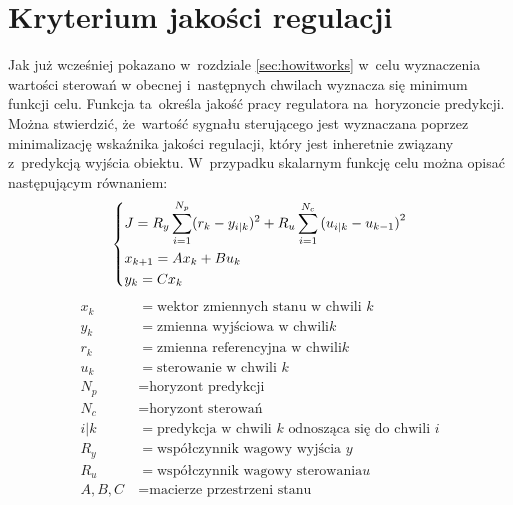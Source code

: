 \section{Kryterium jakości regulacji} \label{sec:quality}
Jak już wcześniej pokazano w~rozdziale \ref{sec:howitworks} w~celu wyznaczenia wartości sterowań
w obecnej i~następnych chwilach wyznacza się minimum funkcji celu. Funkcja ta~określa jakość pracy
regulatora na~horyzoncie predykcji. Można stwierdzić, że~wartość sygnału sterującego jest wyznaczana
poprzez minimalizację wskaźnika jakości regulacji, który jest inheretnie związany z~predykcją wyjścia
obiektu. \cite{mpc_book} \cite{mpc_pl} \cite{mpc_en} \cite{nuclear}
\newline W~przypadku skalarnym funkcję celu można opisać następującym równaniem:
\begin{equation}
    \begin{dcases}
        J=R_{y}\sum _{i=1}^{N_{p}}(r_{k}-y_{i|k})^{2}+R_{u}\sum _{i=1}^{N_{c}}{(u_{i|k}-u_{k-1})}^{2}\\
        x_{k+1}=Ax_{k}+Bu_{k}\\
        y_{k}=Cx_{k} 
    \end{dcases}
\label{eq:quality}
\end{equation}
\begin{align*}
    x_{k} &= \text{wektor zmiennych stanu w~chwili }k\\
    y_{k} &= \text{zmienna wyjściowa w~chwili} k\\
    r_{k} &= \text{zmienna referencyjna w~chwili} k\\
    u_{k} &= \text{sterowanie w~chwili }k\\
    N_{p} &= \text{horyzont predykcji}\\
    N_{c} &= \text{horyzont sterowań}\\
    i|k &= \text{predykcja w~chwili }k\text{ odnosząca się do~chwili }i\\
    R_{y} &= \text{współczynnik wagowy wyjścia }y\\
    R_{u} &= \text{współczynnik wagowy sterowania}u\\
    A, B, C~&= \text{macierze przestrzeni stanu}
\end{align*}

